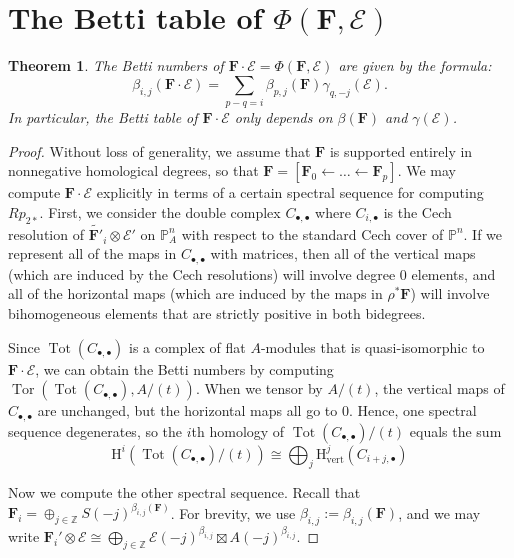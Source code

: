 \documentclass[12pt]{amsart}
\newtheorem{theorem}[lemma]{Theorem}
\theoremstyle{definition}
\theoremstyle{remark}
\newcommand{\Tor}{\operatorname{Tor}}
\newcommand{\Tot}{\operatorname{Tot}}
\newcommand{\PP}{\mathbb{P}}
\newcommand{\HH}{\mathrm{H}}
\newcommand{\ZZ}{\mathbb{Z}}
\newcommand{\cE}{\mathcal{E}}
\newcommand{\FF}{\mathbf{F}}
\begin{document}
\section{The Betti table of $\Phi(\FF,\cE)$}\label{sec:duality pairing}

\begin{theorem}\label{thm:betti numbers of pairing}
The Betti numbers of $\FF\cdot \cE = \Phi(\FF,\cE)$ are given by the formula:
\[
\beta_{i,j}(\FF\cdot \cE)=\sum_{p-q=i}  \beta_{p,j}(\FF)\gamma_{q,-j}(\cE).
\]
In particular, the Betti table of $\FF\cdot \cE$ only depends on $\beta(\FF)$ and $\gamma(\cE)$.
\end{theorem}
\begin{proof}
Without loss of generality, we assume that $\FF$ is supported entirely in nonnegative homological degrees, so that $\FF=[\FF_0\gets \dots \gets \FF_p]$.  
We may compute $\FF\cdot \cE$ explicitly in terms of a certain spectral sequence for computing $Rp_{2*}$.  First, we consider the double complex $C_{\bullet, \bullet}$ where $C_{i,\bullet}$ is the Cech resolution of $\widetilde{\FF'}_i\otimes \cE'$ on $\PP^n_A$ with respect to the standard Cech cover of $\mathbb P^n$.  If we represent all of the maps in $C_{\bullet, \bullet}$ with matrices, then all of the vertical maps (which are induced by the Cech resolutions) will involve degree $0$ elements, and all of the horizontal maps (which are induced by the maps in $\rho^*\FF$) will involve bihomogeneous elements that are strictly positive in both bidegrees.

Since $\Tot(C_{\bullet, \bullet})$ is a complex of flat $A$-modules that is quasi-isomorphic to $\FF\cdot \cE$, we can obtain the Betti numbers by computing $\Tor(\Tot(C_{\bullet, \bullet}), A/(t))$.  When we tensor by $A/(t)$, the vertical maps of $C_{\bullet, \bullet}$ are unchanged, but the horizontal maps all go to $0$.  
Hence, one spectral sequence degenerates, so the $i$th homology of $\Tot(C_{\bullet,\bullet})/(t)$ equals the sum 
\[
\HH^i(\Tot(C_{\bullet,\bullet})/(t))\cong \bigoplus_{j} \HH^j_{\text{vert}}(C_{i+j,\bullet})
\]

Now we compute the other spectral sequence.
Recall that $\FF_i=\oplus_{j\in \ZZ} S(-j)^{\beta_{i,j}(\FF)}$.  For brevity, we use $\beta_{i,j}:=\beta_{i,j}(\FF)$, and we may write $\FF_i'\otimes \cE\cong \bigoplus_{j\in \ZZ} \cE(-j)^{\beta_{i,j}}\boxtimes A(-j)^{\beta_{i,j}}$.


\end{proof}
\end{document}
